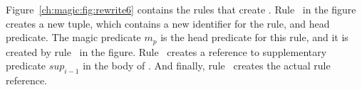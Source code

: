 Figure~\ref{ch:magic:fig:rewrite6} contains the rules that create
.  Rule~ in the figure creates a new 
tuple, which contains a new identifier for the rule, and head predicate.  The
magic predicate $m_p$ is the head predicate for this rule, and it is created by
rule~ in the figure.  Rule~ creates a reference to
supplementary predicate $sup_{i-1}$ in the body of .  And
finally, rule~ creates the actual rule reference.


%	
%	
%	
